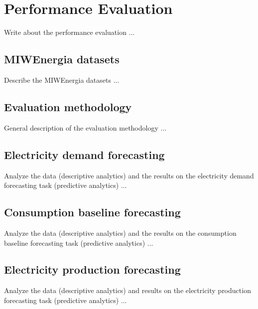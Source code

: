 \chapter{Performance Evaluation}
\label{cha:evaluation}
\vspace{0.4 cm}

Write about the performance evaluation ...

\section{MIWEnergia datasets}
\label{sec:datasets}
\vspace{0.2 cm}

Describe the MIWEnergia datasets ...


\section{Evaluation methodology}
\label{sec:methodology}
\vspace{0.2 cm}

General description of the evaluation methodology ...


\section{Electricity demand forecasting}
\label{sec:demandval}
\vspace{0.2 cm}

Analyze the data (descriptive analytics) and the results on the electricity demand forecasting task (predictive analytics) ...


\section{Consumption baseline forecasting}
\label{sec:baselineval}
\vspace{0.2 cm}

Analyze the data (descriptive analytics) and the results on the consumption baseline forecasting task (predictive analytics) ...


\section{Electricity production forecasting}
\label{sec:productionval}
\vspace{0.2 cm}

Analyze the data (descriptive analytics)  and results on the electricity production forecasting task (predictive analytics) ...
